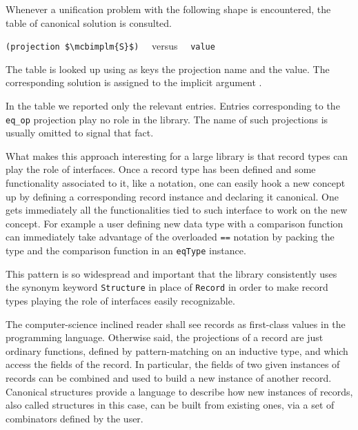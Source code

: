 Whenever a unification problem with the following shape is encountered,
the table of canonical solution is consulted.
\begin{center}
\lstinline/(projection $\mcbimplm{S}$)/ ~~versus~~ \lstinline/value/
\end{center}
The table is looked up using as keys the projection name and the
value.  The corresponding solution is assigned to the implicit
argument .

In the table we reported only the relevant entries.  Entries
corresponding to the \lstinline/eq_op/ projection play no role
in the \mcbMC{} library. The name of such projections is
usually omitted to signal that fact.

What makes this approach interesting for a large library is that
record types can play the role of interfaces.  Once a record type has
been defined and some functionality associated to it, like a notation,
one can easily hook a new concept up by defining a corresponding
record instance and declaring it canonical.  One gets immediately all
the functionalities tied to such interface to work on the new concept.
For example a user defining new data type with a comparison function
can immediately take advantage of the overloaded \lstinline/==/
notation by packing the type and the comparison function in an
\lstinline/eqType/ instance.

This pattern is so widespread and important that the \mcbMC{}
library
consistently uses the synonym keyword \lstinline/Structure/ in place of
\lstinline/Record/ in order to make record types playing the role
of interfaces easily recognizable.

The computer-science inclined reader shall see records as first-class
values in the  \mcbCIC{} programming language. Otherwise said,
the projections of a record are just ordinary functions, defined by
pattern-matching on an inductive type, and which access the fields
of the record.
In particular,  the fields of two given instances of records can be
combined and used to build a new instance of another record. Canonical
structures provide a language to describe how new instances of
records, also called structures in this case, can
be built from existing ones, via a set of combinators defined by the
user. %

